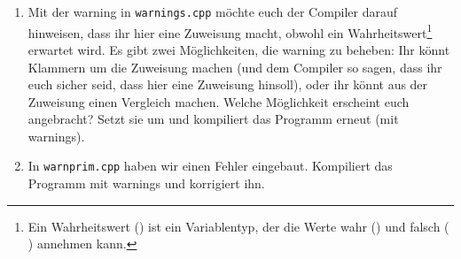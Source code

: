 \begin{praxis}
    \begin{enumerate}[resume]
        \item Mit der warning in \texttt{warnings.cpp} möchte euch der Compiler
              darauf hinweisen, dass ihr hier eine Zuweisung macht, obwohl ein
              Wahrheitswert\footnote{Ein Wahrheitswert () ist ein
                  Variablentyp, der die Werte wahr () und falsch (
                  ) annehmen kann.}
              erwartet wird. Es gibt zwei Möglichkeiten, die warning zu
              beheben: Ihr könnt Klammern um die Zuweisung machen (und dem Compiler
              so sagen, dass ihr euch sicher seid, dass hier eine Zuweisung hinsoll),
              oder ihr könnt aus der Zuweisung einen Vergleich machen. Welche
              Möglichkeit erscheint euch angebracht? Setzt sie um und kompiliert das
              Programm erneut (mit warnings).
        \item In \texttt{warnprim.cpp} haben wir einen Fehler eingebaut. Kompiliert
              das Programm mit warnings und korrigiert ihn.
    \end{enumerate}


\end{praxis}